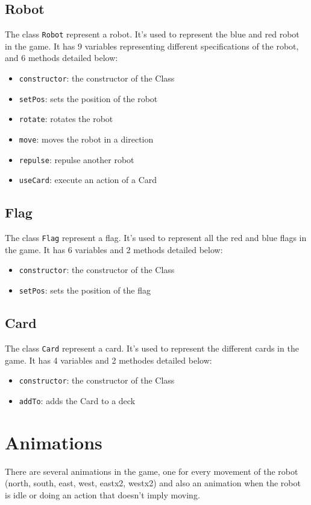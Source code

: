 \documentclass[a4paper, 10pt, oneside]{article}
\begin{document}
	\subsection{Robot}
		The class \texttt{Robot} represent a robot. It's used to represent the blue and red robot in the game. It has 9 variables representing different specifications of the robot, and 6 methods detailed below:
			\begin{itemize}
				\item \texttt{constructor}: the constructor of the Class
				\item \texttt{setPos}: sets the position of the robot
				\item \texttt{rotate}: rotates the robot
				\item \texttt{move}: moves the robot in a direction
				\item \texttt{repulse}: repulse another robot
				\item \texttt{useCard}: execute an action of a Card
			\end{itemize}
			
	\subsection{Flag}
		The class \texttt{Flag} represent a flag. It's used to represent all the red and blue flags in the game. It has 6 variables and 2 methods detailed below:
			\begin{itemize}
				\item \texttt{constructor}: the constructor of the Class
				\item \texttt{setPos}: sets the position of the flag
			\end{itemize}
			
	\subsection{Card}
		The class \texttt{Card} represent a card. It's used to represent the different cards in the game. It has 4 variables and 2 methodes detailed below:
			\begin{itemize}
				\item \texttt{constructor}: the constructor of the Class
				\item \texttt{addTo}: adds the Card to a deck
			\end{itemize}
			
\section{Animations}
	There are several animations in the game, one for every movement of the robot (north, south, east, west, eastx2, westx2) and also an animation when the robot is idle or doing an action that doesn't imply moving.
	
\end{document}

